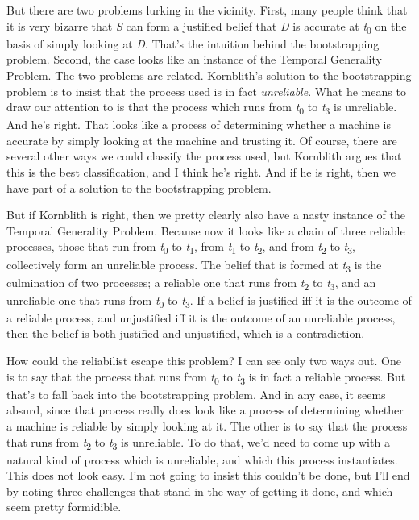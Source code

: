\documentclass[
  10pt,
  letterpaper,
  DIV=11,
  numbers=noendperiod,
  twoside]{scrartcl}
\begin{document}
But there are two problems lurking in the vicinity. First, many people
think that it is very bizarre that \emph{S} can form a justified belief
that \emph{D} is accurate at \emph{t}\textsubscript{0} on the basis of
simply looking at \emph{D}. That's the intuition behind the
bootstrapping problem. Second, the case looks like an instance of the
Temporal Generality Problem. The two problems are related. Kornblith's
solution to the bootstrapping problem is to insist that the process used
is in fact \emph{unreliable}. What he means to draw our attention to is
that the process which runs from \emph{t}\textsubscript{0} to
\emph{t}\textsubscript{3} is unreliable. And he's right. That looks like
a process of determining whether a machine is accurate by simply looking
at the machine and trusting it. Of course, there are several other ways
we could classify the process used, but Kornblith argues that this is
the best classification, and I think he's right. And if he is right,
then we have part of a solution to the bootstrapping problem.

But if Kornblith is right, then we pretty clearly also have a nasty
instance of the Temporal Generality Problem. Because now it looks like a
chain of three reliable processes, those that run from
\emph{t}\textsubscript{0} to \emph{t}\textsubscript{1}, from
\emph{t}\textsubscript{1} to \emph{t}\textsubscript{2}, and from
\emph{t}\textsubscript{2} to \emph{t}\textsubscript{3}, collectively
form an unreliable process. The belief that is formed at
\emph{t}\textsubscript{3} is the culmination of two processes; a
reliable one that runs from \emph{t}\textsubscript{2} to
\emph{t}\textsubscript{3}, and an unreliable one that runs from
\emph{t}\textsubscript{0} to \emph{t}\textsubscript{3}. If a belief is
justified iff it is the outcome of a reliable process, and unjustified
iff it is the outcome of an unreliable process, then the belief is both
justified and unjustified, which is a contradiction.

How could the reliabilist escape this problem? I can see only two ways
out. One is to say that the process that runs from
\emph{t}\textsubscript{0} to \emph{t}\textsubscript{3} is in fact a
reliable process. But that's to fall back into the bootstrapping
problem. And in any case, it seems absurd, since that process really
does look like a process of determining whether a machine is reliable by
simply looking at it. The other is to say that the process that runs
from \emph{t}\textsubscript{2} to \emph{t}\textsubscript{3} is
unreliable. To do that, we'd need to come up with a natural kind of
process which is unreliable, and which this process instantiates. This
does not look easy. I'm not going to insist this couldn't be done, but
I'll end by noting three challenges that stand in the way of getting it
done, and which seem pretty formidible.
\end{document}
